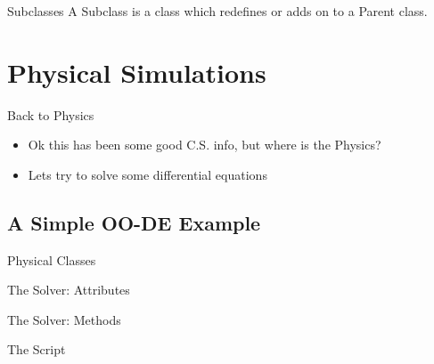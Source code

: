 \documentclass[mathserif]{beamer}
\providecommand{\inputcode}[1]{
  \begin{block}{}
    \scriptsize{}
  \end{block}
}
\begin{document}
\begin{frame}{Subclasses}
  A \alert{Subclass} is a class which redefines or adds on to a \alert{Parent} class. 

  \inputcode{examples/student}
\end{frame}

\section{Physical Simulations}

\begin{frame}{Back to Physics}
  \begin{itemize}
    \item Ok this has been some good C.S. info, but where is the Physics?
    \item<2-> Lets try to solve some differential equations
  \end{itemize}
\end{frame}

\subsection{A Simple OO-DE Example}

\begin{frame}{Physical Classes}
  \inputcode{code/class0}
\end{frame}

\begin{frame}{The Solver: Attributes}
  \inputcode{code/class1}
\end{frame}

\begin{frame}{The Solver: Methods}
  \inputcode{code/class2}
\end{frame}

\begin{frame}{The Script}
  \begin{columns}
    \begin{column}{0.49\linewidth}
      \inputcode{code/example1}
    \end{column}
    \begin{column}{0.49\linewidth}
      \inputcode{code/example2}
      \vspace{4mm}
      \centering
    \end{column}
  \end{columns}
\end{frame}
\end{document}
